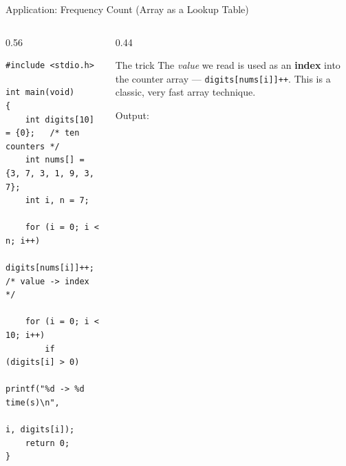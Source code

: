 \documentclass[aspectratio=169]{beamer}
\begin{document}
	\begin{frame}[fragile]{Application: Frequency Count (Array as a Lookup Table)}
		\begin{columns}[T]
			\begin{column}{0.56\textwidth}
				\begin{lstlisting}
#include <stdio.h>

int main(void)
{
    int digits[10] = {0};   /* ten counters */
    int nums[] = {3, 7, 3, 1, 9, 3, 7};
    int i, n = 7;

    for (i = 0; i < n; i++)
        digits[nums[i]]++;  /* value -> index */

    for (i = 0; i < 10; i++)
        if (digits[i] > 0)
            printf("%d -> %d time(s)\n",
                    i, digits[i]);
    return 0;
}
				\end{lstlisting}
			\end{column}
			\begin{column}{0.44\textwidth}
				\begin{block}{The trick}
					\small The \emph{value} we read is used as an \textbf{index} into the counter array
					--- \texttt{digits[nums[i]]++}. This is a classic, very fast array technique.
				\end{block}
				\centering\footnotesize
				Output:\\[2pt]
			\end{column}
		\end{columns}
	\end{frame}

\end{document}
